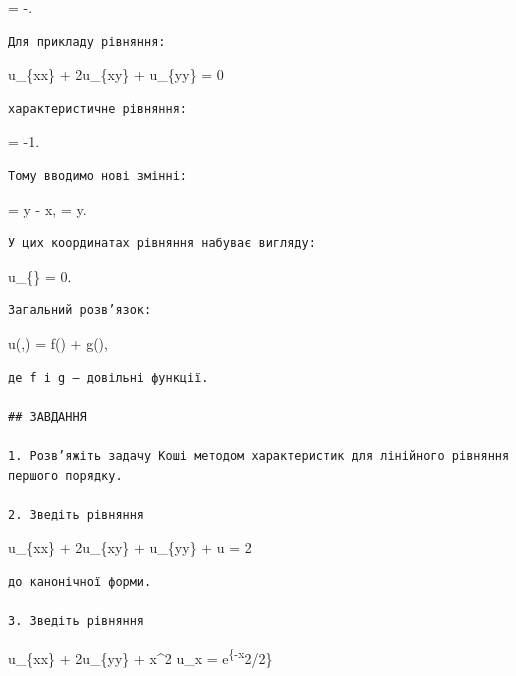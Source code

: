 \documentclass[
  ukrainian,
]{article}
\begin{document}
 = -.

\begin{verbatim}
Для прикладу рівняння:
\end{verbatim}

u\_\{xx\} + 2u\_\{xy\} + u\_\{yy\} = 0

\begin{verbatim}
характеристичне рівняння:
\end{verbatim}

 = -1.

\begin{verbatim}
Тому вводимо нові змінні:
\end{verbatim}

\xi = y - x, \qquad \eta = y.

\begin{verbatim}
У цих координатах рівняння набуває вигляду:
\end{verbatim}

u\_\{\eta\eta\} = 0.

\begin{verbatim}
Загальний розв’язок:
\end{verbatim}

u(\xi,\eta) = \eta f(\xi) + g(\xi),

\begin{verbatim}
де f і g — довільні функції.

## ЗАВДАННЯ

1. Розв’яжіть задачу Коші методом характеристик для лінійного рівняння першого порядку.

2. Зведіть рівняння
\end{verbatim}

u\_\{xx\} + 2u\_\{xy\} + u\_\{yy\} + u = 2

\begin{verbatim}
до канонічної форми.

3. Зведіть рівняння
\end{verbatim}

u\_\{xx\} + 2u\_\{yy\} + x\^{}2 u\_x = e\textsuperscript{\{-x}2/2\}
\end{document}
